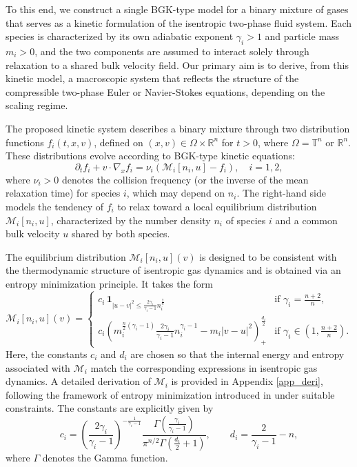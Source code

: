 \documentclass[10pt,reqno]{amsart}
\numberwithin{equation}{section}
\newcommand{\R}{\mathbb R}
\newcommand{\T}{\mathbb T}
\begin{document}
To this end, we construct a single BGK-type model for a binary mixture of gases that serves as a kinetic formulation of the isentropic two-phase fluid system.  Each species is characterized by its own adiabatic exponent $\gamma_i > 1$ and particle mass $m_i > 0$, and the two components are assumed to interact solely through relaxation to a shared bulk velocity field. Our primary aim is to derive, from this kinetic model, a macroscopic system that reflects the structure of the compressible two-phase Euler or Navier-Stokes equations, depending on the scaling regime.

The proposed kinetic system describes a binary mixture through two distribution functions $f_i(t,x,v)$, defined on $(x,v) \in \Omega \times \R^n$ for $t>0$, where $\Omega = \T^n$ or $\R^n$. These distributions evolve according to BGK-type kinetic equations:
\begin{equation}\label{main}
\partial_t f_i + v \cdot \nabla_x f_i = \nu_i \left( \mathcal{M}_i[n_i, u] - f_i \right), \quad i=1,2,
\end{equation}
where $\nu_i > 0$ denotes the collision frequency (or the inverse of the mean relaxation time) for species $i$, which may depend on $n_i$. The right-hand side models the tendency of $f_i$ to relax toward a local equilibrium distribution $\mathcal{M}_i[n_i, u]$, characterized by the number density $n_i$ of species $i$ and a common bulk velocity $u$ shared by both species.

The equilibrium distribution $\mathcal{M}_i[n_i, u](v)$ is designed to be consistent with the thermodynamic structure of isentropic gas dynamics and is obtained via an entropy minimization principle. It takes the form
\[
\mathcal{M}_i[n_i, u](v) =
\begin{cases}
\displaystyle c_i \, \mathbf{1}_{|u-v|^2 \le \frac{2\gamma_i}{\gamma_i - 1} n_i^{\frac 2n}} & \text{if } \gamma_i = \frac{n+2}{n}, \\[2mm]
\displaystyle c_i \left( m_i^{\frac{n}{2}(\gamma_i - 1)} \frac{2\gamma_i}{\gamma_i - 1} n_i^{\gamma_i - 1} - m_i |v - u|^2 \right)_+^{\frac{d_i}{2}} & \text{if } \gamma_i \in \left(1, \frac{n+2}{n} \right).
\end{cases}
\]
Here, the constants $c_i$ and $d_i$ are chosen so that the internal energy and entropy associated with $\mathcal{M}_i$ match the corresponding expressions in isentropic gas dynamics. A detailed derivation of $\mathcal{M}_i$ is provided in Appendix \ref{app_deri}, following the framework of entropy minimization introduced in \cite{B99, LPT94} under suitable constraints. The constants are explicitly given by 
\[
c_i = \left( \frac{2\gamma_i}{\gamma_i - 1} \right)^{-\frac{1}{\gamma_i - 1}} \frac{\Gamma\left( \frac{\gamma_i}{\gamma_i - 1} \right)}{\pi^{n/2} \Gamma\left( \frac{d_i}{2} + 1 \right)}, \qquad
d_i = \frac{2}{\gamma_i - 1} - n,
\]
where $\Gamma$ denotes the Gamma function.  
\end{document}
